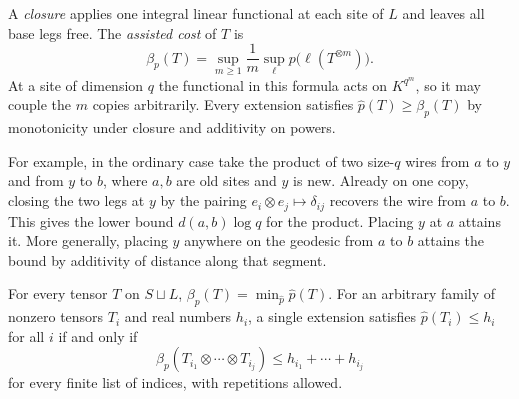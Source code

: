 A \emph{closure} applies one integral linear functional at each site of
\(L\) and leaves all base legs free. The \emph{assisted cost} of \(T\) is
\begin{equation}\label{eq:prices-beta}
 \beta_p(T)=\sup_{m\ge1}\frac1m
       \sup_{\ell}p\bigl(\ell(T^{\otimes m})\bigr).
\end{equation}
At a site of dimension \(q\) the functional in this formula acts on
\(K^{q^m}\), so it may couple the \(m\) copies arbitrarily. Every
extension satisfies \(\widehat p(T)\ge\beta_p(T)\) by monotonicity
under closure and additivity on powers.

For example, in the ordinary case take the product of two size-\(q\) wires
from \(a\) to \(y\) and from \(y\) to \(b\), where \(a,b\) are old sites
and \(y\) is new. Already on one copy, closing the two legs at \(y\) by
the pairing \(e_i\otimes e_j\mapsto\delta_{ij}\) recovers the wire from \(a\)
to \(b\). This gives the lower bound \(d(a,b)\log q\) for the product. Placing
\(y\) at \(a\) attains it. More generally, placing \(y\) anywhere on
the geodesic from \(a\) to \(b\) attains the bound by additivity of
distance along that segment.

\begin{theorem}\label{thm:extension}
For every tensor \(T\) on \(S\sqcup L\),
\(\beta_p(T)=\min_{\widehat p}\widehat p(T)\).
For an arbitrary family of nonzero tensors \(T_i\) and real numbers
\(h_i\), a single extension satisfies \(\widehat p(T_i)\le h_i\)
for all \(i\) if and only if
\begin{equation}\label{eq:prices-product-test}
 \beta_p(T_{i_1}\otimes\cdots\otimes T_{i_j})
 \le h_{i_1}+\cdots+h_{i_j}
\end{equation}
for every finite list of indices, with repetitions allowed.
\end{theorem}

